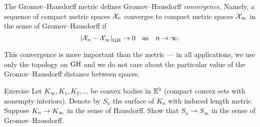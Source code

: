 The Gromov--Hausdorff metric defines Gromov--Hausdorff \emph{convergence}.
Namely, a sequence of compact metric spaces $\mathcal{X}_n$ converges to compact metric spaces $\mathcal{X}_\infty$ in the sense of Gromov--Hausdorff if 
\[\dist{\spc{X}_n}{\spc{X}_\infty}{\GH}\to 0\quad\text{as}\quad n\to\infty.\]

This convergence is more important than the metric ---
in all applications, we use only the topology on $\operatorname{\rm GH}\nolimits$
and we do not care about the particular value of the Gromov--Hausdorff distance between spaces.

\begin{thm}{Exercise}\label{ex:surface-covergence}
Let $K_\infty,K_1,K_2,\dots$ be convex bodies in $\mathbb{E}^3$ (compact convex sets with nonempty interiors).
Denote by $S_n$ the surface of $K_n$ with induced length metric.
Suppose $K_n\z\to K_\infty$ in the sense of Hausdorff.
Show that $S_n\to S_\infty$ in the sense of Gromov--Hausdorff.
\end{thm}
